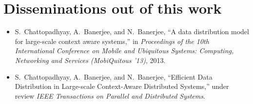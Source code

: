 \chapter {Disseminations out of this work}
\begin{itemize}

\item S.~Chattopadhyay, A.~Banerjee, and N.~Banerjee, ``A data distribution model for
  large-scale context aware systems,'' in \emph{Proceedings of the 10th
  International Conference on Mobile and Ubiquitous Systems: Computing,
  Networking and Services (MobiQuitous '13)}, 2013.

  \item
  S.~Chattopadhyay, A.~Banerjee, and N.~Banerjee, ``Efficient Data Distribution in Large-scale
Context-Aware Distributed Systems,'' under review \emph{IEEE Transactions on Parallel and Distributed Systems}.
  
  

\end{itemize}
